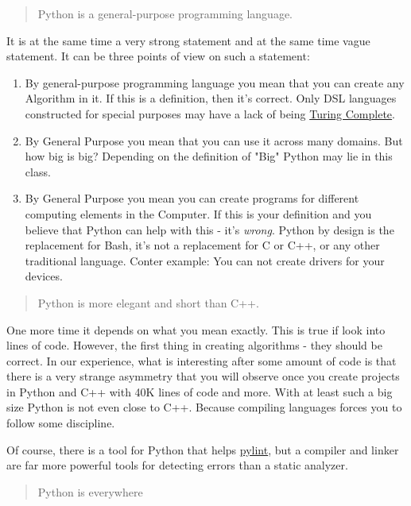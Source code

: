 \documentclass[
]{article}
\begin{document}
\begin{quote}
Python is a general-purpose programming language.
\end{quote}

It is at the same time a very strong statement and at the same time
vague statement. It can be three points of view on such a statement:

\begin{enumerate}
\def\labelenumi{\arabic{enumi}.}
\item
  By general-purpose programming language you mean that you can create
  any Algorithm in it. If this is a definition, then it's correct. Only
  DSL languages constructed for special purposes may have a lack of
  being \href{https://en.wikipedia.org/wiki/Turing_completeness}{Turing
  Complete}.
\item
  By General Purpose you mean that you can use it across many domains.
  But how big is big? Depending on the definition of "Big" Python may
  lie in this class.
\item
  By General Purpose you mean you can create programs for different
  computing elements in the Computer. If this is your definition and you
  believe that Python can help with this - it's \emph{wrong}. Python by
  design is the replacement for Bash, it's not a replacement for C or
  C++, or any other traditional language. Conter example: You can not
  create drivers for your devices.
\end{enumerate}

\begin{quote}
Python is more elegant and short than C++.
\end{quote}

One more time it depends on what you mean exactly. This is true if look
into lines of code. However, the first thing in creating algorithms -
they should be correct. In our experience, what is interesting after
some amount of code is that there is a very strange asymmetry that you
will observe once you create projects in Python and C++ with 40K lines
of code and more. With at least such a big size Python is not even close
to C++. Because compiling languages forces you to follow some
discipline.

Of course, there is a tool for Python that helps
\href{https://pypi.org/project/pylint/}{pylint}, but a compiler and
linker are far more powerful tools for detecting errors than a static
analyzer.

\begin{quote}
Python is everywhere
\end{quote}
\end{document}
